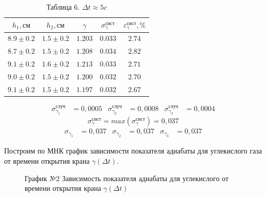 \documentclass[a4paper]{article}
\begin{document}
\begin{table}[h!]
    \centering
    \begin{tabular}{|c|c|c|c|c|}
        \hline
        $h_1, \text{см}$ & $h_2, \text{см}$ & $\gamma$ & $\sigma_\gamma^{\text{сист}}$ & $\varepsilon_\gamma^{\text{сист}}, \%$ \\
        \hline
        $8.9 \pm 0.2$ & $1.5 \pm 0.2$ & $1.203$ & $0.033$ & $2.74$ \\ \hline
        $8.7 \pm 0.2$ & $1.5 \pm 0.2$ & $1.208$ & $0.034$ & $2.82$ \\ \hline
        $9.1 \pm 0.2$ & $1.6 \pm 0.2$ & $1.213$ & $0.033$ & $2.71$ \\ \hline
        $9.0 \pm 0.2$ & $1.5 \pm 0.2$ & $1.200$ & $0.032$ & $2.70$ \\ \hline
        $9.1 \pm 0.2$ & $1.5 \pm 0.2$ & $1.197$ & $0.032$ & $2.67$ \\ \hline
    \end{tabular}
    \caption{Таблица 6. $\Delta t \approx 5 c$}
\end{table}

\begin{align}
    \sigma_{\gamma_1}^{\text{случ}} &= 0,0005 & \sigma_{\gamma_2}^{\text{случ}} &= 0,0008 & \sigma_{\gamma_3}^{\text{случ}} &= 0,0004
\end{align}
\begin{equation*}
	\sigma_\gamma^{\text{сист}} = max(\sigma_\gamma^{\text{сист}}) = 0,037
\end{equation*}
\begin{align}
    \sigma_{\gamma_1} &= 0,037 & \sigma_{\gamma_2} &= 0,037 & \sigma_{\gamma_3} &= 0,037
\end{align}

Построим по МНК график зависимости показателя адиабаты для углекислого газа от времени открытия крана $\gamma(\Delta t)$.
\clearpage
\begin{figure}[h!]
\caption[]{\label{} График №2 Зависимость показателя адиабаты для углекислого от времени открытия крана $\gamma(\Delta t)$}
\end{figure}
\end{document}
